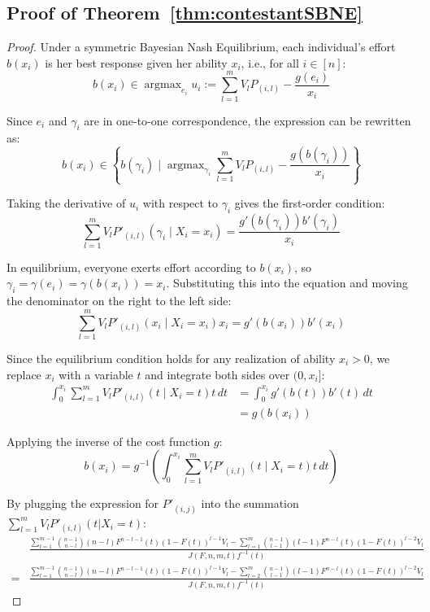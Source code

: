 \subsection*{Proof of Theorem~\ref{thm:contestantSBNE}}
\begin{proof}
Under a symmetric Bayesian Nash Equilibrium, each individual's effort \( b(x_i) \) is her best response given her ability \( x_i \), i.e., for all \( i \in [n] \):
\[
b(x_i) \in \mathop{\arg \max}_{e_i} u_i := \sum_{l=1}^{m} V_l P_{(i,l)} - \frac{g(e_i)}{x_i}
\]

Since \( e_i \) and \( \gamma_i \) are in one-to-one correspondence, the expression can be rewritten as:
\[
b(x_i) \in \left\{ b(\gamma_i) \mid \mathop{\arg \max}_{\gamma_i} \sum_{l=1}^{m} V_l P_{(i,l)} - \frac{g(b(\gamma_i))}{x_i} \right\}
\]

Taking the derivative of \( u_i \) with respect to \( \gamma_i \) gives the first-order condition:
\[
\sum_{l=1}^{m} V_l P'_{(i,l)}(\gamma_i \mid X_i = x_i) = \frac{g'(b(\gamma_i)) b'(\gamma_i)}{x_i}
\]

In equilibrium, everyone exerts effort according to \( b(x_i) \), so \( \gamma_i = \gamma(e_i) = \gamma(b(x_i)) = x_i \). Substituting this into the equation and moving the denominator on the right to the left side:
\[
\sum_{l=1}^{m} V_l P'_{(i,l)}(x_i \mid X_i = x_i)x_i = g'(b(x_i)) b'(x_i)
\]

Since the equilibrium condition holds for any realization of ability \( x_i > 0 \), we replace \( x_i \) with a variable \( t \) and integrate both sides over \((0, x_i]\):
\[
\begin{aligned}
\int_{0}^{x_i} \sum_{l=1}^{m} V_l P'_{(i,l)}(t \mid X_i = t)t \, dt &  = \int_{0}^{x_i} g'(b(t)) b'(t) \, dt \\
 & = g(b(x_i)) 
\end{aligned}
\]

Applying the inverse of the cost function \( g \): 
\[
b(x_i) = g^{-1}\left( \int_{0}^{x_i} \sum_{l=1}^{m} V_l P'_{(i,l)}(t \mid X_i = t)t \, dt \right)
\]

By plugging the expression for $P'_{(i,j)}$ into the summation \(\sum_{l=1}^{m}V_lP'_{(i,l)}(t|X_i=t)\):
\[
\begin{aligned} 
    & \frac{\sum_{l=1}^{m-1}\binom{n-1}{n-l}(n-l)F^{n-l-1}(t)(1-F(t))^{l-1}V_l - \sum_{l=1}^m\binom{n-1}{l-1}(l-1)F^{n-l}(t)(1-F(t))^{l-2}V_l}{J(F,n,m,t)f^{-1}(t)} \\
    = & \frac{\sum_{l=1}^{m-1}\binom{n-1}{n-l}(n-l)F^{n-l-1}(t)(1-F(t))^{l-1}V_l - \sum_{l=2}^m\binom{n-1}{l-1}(l-1)F^{n-l}(t)(1-F(t))^{l-2}V_l}{J(F,n,m,t)f^{-1}(t)}
\end{aligned}
\]


\end{proof}
